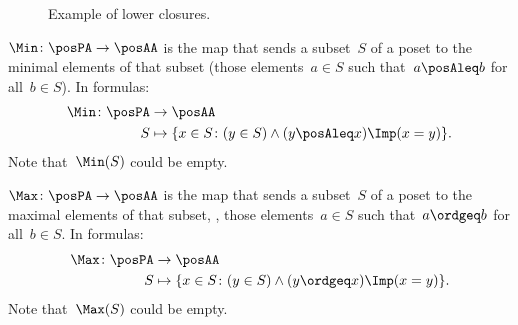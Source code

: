\begin{figure*}[h!]
  \begin{center}
  \end{center}
  \caption{Example of lower closures.}
  \label{fig:examplebatt}
\end{figure*}


\begin{definition}[Min]
  \label{def:Min}
  $\Min \colon \posPA \to \posAA$ is the map that sends a subset~$S$ of a poset to the minimal elements of that subset (those elements~$a \in S$ such that~$a \posAleq b$ for all~$b \in S$).
  In formulas:
  \begin{equation*}
    \begin{aligned}
      \Min \colon \posPA &\to \posAA\\
      S&\mapsto \{ x\in S\colon (y\in S)\wedge(y\posAleq x)\Imp (x=y)\}.
    \end{aligned}
  \end{equation*}
  Note that~$\Min(S)$ could be empty.
\end{definition}

\begin{definition}[Max]
  \label{def:Max}
  $\Max \colon \posPA \to \posAA$ is the map that sends a subset~$S$ of a poset to the maximal elements of that subset, \ie , those elements~$a \in S$ such that~$a \ordgeq b$ for all~$b \in S$. In formulas:
  \begin{equation*}
    \begin{aligned}
      \Max \colon \posPA &\to \posAA\\
      S&\mapsto \{ x\in S\colon (y\in S)\wedge(y\ordgeq x)\Imp (x=y)\}.
    \end{aligned}
  \end{equation*}
  Note that~$\Max(S)$ could be empty.
\end{definition}

